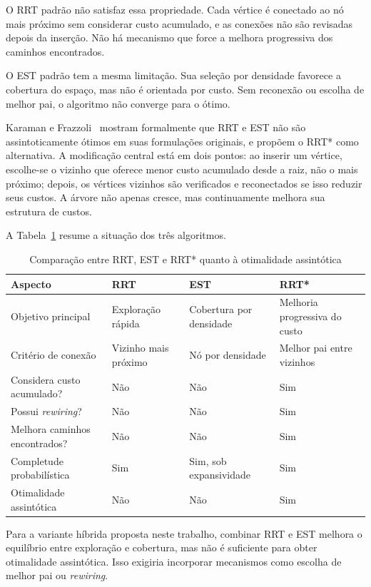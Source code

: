 O RRT padrão não satisfaz essa propriedade. Cada vértice é conectado ao nó mais próximo sem considerar custo acumulado, e as conexões não são revisadas depois da inserção. Não há mecanismo que force a melhora progressiva dos caminhos encontrados.

O EST padrão tem a mesma limitação. Sua seleção por densidade favorece a cobertura do espaço, mas não é orientada por custo. Sem reconexão ou escolha de melhor pai, o algoritmo não converge para o ótimo.

Karaman e Frazzoli~\cite{Karaman2011SamplingbasedAF} mostram formalmente que RRT e EST não são assintoticamente ótimos em suas formulações originais, e propõem o RRT* como alternativa. A modificação central está em dois pontos: ao inserir um vértice, escolhe-se o vizinho que oferece menor custo acumulado desde a raiz, não o mais próximo; depois, os vértices vizinhos são verificados e reconectados se isso reduzir seus custos. A árvore não apenas cresce, mas continuamente melhora sua estrutura de custos.

A Tabela~\ref{tab:comparacao_otimalidade_rrt_est} resume a situação dos três algoritmos.

\begin{table}[H]
\centering
\caption{Comparação entre RRT, EST e RRT* quanto à otimalidade assintótica}
\label{tab:comparacao_otimalidade_rrt_est}
\begin{tabular}{@{}p{4cm}p{3.5cm}p{3.5cm}p{3.5cm}@{}}
\toprule
\textbf{Aspecto} & \textbf{RRT} & \textbf{EST} & \textbf{RRT*} \\ \midrule
Objetivo principal & Exploração rápida & Cobertura por densidade & Melhoria progressiva do custo \\
Critério de conexão & Vizinho mais próximo & Nó por densidade & Melhor pai entre vizinhos \\
Considera custo acumulado? & Não & Não & Sim \\
Possui \textit{rewiring}? & Não & Não & Sim \\
Melhora caminhos encontrados? & Não & Não & Sim \\
Completude probabilística & Sim & Sim, sob expansividade & Sim \\
Otimalidade assintótica & Não & Não & Sim \\ \bottomrule
\end{tabular}
\end{table}

Para a variante híbrida proposta neste trabalho, combinar RRT e EST melhora o equilíbrio entre exploração e cobertura, mas não é suficiente para obter otimalidade assintótica. Isso exigiria incorporar mecanismos como escolha de melhor pai ou \textit{rewiring}.


